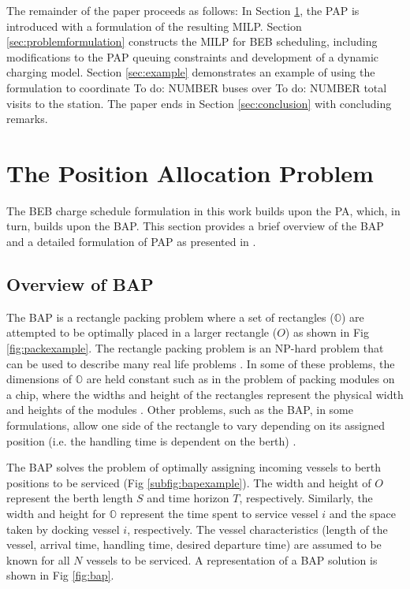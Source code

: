 \documentclass[utf8]{FrontiersinHarvard}
\newcommand{\TODO}[1]{{\color{green} To do: #1}}                                %
\begin{document}
The remainder of the paper proceeds as follows: In Section \ref{sec:positionallocationproblem}, the PAP is introduced
with a formulation of the resulting MILP. Section \ref{sec:problemformulation} constructs the MILP for BEB scheduling,
including modifications to the PAP queuing constraints and development of a dynamic charging model. Section
\ref{sec:example} demonstrates an example of using the formulation to coordinate \TODO{NUMBER} buses over \TODO{NUMBER}
total visits to the station. The paper ends in Section \ref{sec:conclusion} with concluding remarks.

\section{The Position Allocation Problem}
\label{sec:positionallocationproblem}
The BEB charge schedule formulation in this work builds upon the PA, which, in turn, builds upon the BAP. This section
provides a brief overview of the BAP and a detailed formulation of PAP as presented in \citep{Qarebagh2019}.

\subsection{Overview of BAP}
The BAP is a rectangle packing problem where a set
of rectangles ($\mathbb{O}$) are attempted to be optimally placed in a larger rectangle ($O$) as shown in Fig
\ref{fig:packexample}. The rectangle packing problem is an NP-hard problem that can be used to describe many real life
problems \citep{Bruin2013,Murata1995}. In some of these problems, the dimensions of $\mathbb{O}$ are held constant such
as in the problem of packing modules on a chip, where the widths and height of the rectangles represent the physical
width and heights of the modules \citep{Murata1995}. Other problems, such as the BAP, in some formulations, allow one side of
the rectangle to vary depending on its assigned position (i.e. the handling time is dependent on the berth)
\citep{Buhrkal2010}.

The BAP solves the problem of optimally assigning incoming vessels to berth positions to be serviced (Fig
\ref{subfig:bapexample}). The width and height of $O$ represent the berth length $S$ and time horizon $T$, respectively.
Similarly, the width and height for $\mathbb{O}$ represent the time spent to service vessel $i$ and the space taken by
docking vessel $i$, respectively. The vessel characteristics (length of the vessel, arrival time, handling time, desired
departure time) are assumed to be known for all $N$ vessels to be serviced. A representation of a BAP solution is shown
in Fig \ref{fig:bap}.
\end{document}
